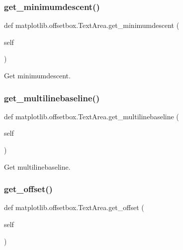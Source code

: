 \subsubsection{\texorpdfstring{get\+\_\+minimumdescent()}{get\_minimumdescent()}}
{\footnotesize\ttfamily def matplotlib.\+offsetbox.\+Text\+Area.\+get\+\_\+minimumdescent (\begin{DoxyParamCaption}\item[{}]{self }\end{DoxyParamCaption})}

\begin{DoxyVerb}Get minimumdescent.
\end{DoxyVerb}
 \mbox{\label{classmatplotlib_1_1offsetbox_1_1TextArea_a0ed4b54d2388fd77f00395350043882e}} 
\subsubsection{\texorpdfstring{get\+\_\+multilinebaseline()}{get\_multilinebaseline()}}
{\footnotesize\ttfamily def matplotlib.\+offsetbox.\+Text\+Area.\+get\+\_\+multilinebaseline (\begin{DoxyParamCaption}\item[{}]{self }\end{DoxyParamCaption})}

\begin{DoxyVerb}Get multilinebaseline.
\end{DoxyVerb}
 \mbox{\label{classmatplotlib_1_1offsetbox_1_1TextArea_abd1148d17e19b2ec5a46c44f7f48dc5b}} 
\subsubsection{\texorpdfstring{get\+\_\+offset()}{get\_offset()}}
{\footnotesize\ttfamily def matplotlib.\+offsetbox.\+Text\+Area.\+get\+\_\+offset (\begin{DoxyParamCaption}\item[{}]{self }\end{DoxyParamCaption})}

